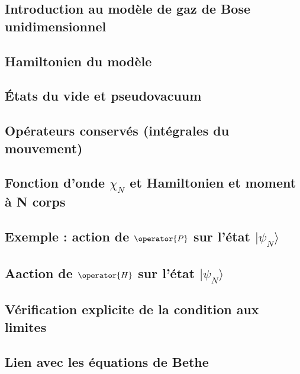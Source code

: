 \subsection{Introduction au modèle de gaz de Bose unidimensionnel}


\subsection{Hamiltonien du modèle}


\subsection{États du vide et pseudovacuum}



\subsection{Opérateurs conservés (intégrales du mouvement)}

 
\subsection{Fonction d’onde $\chi_N$ et Hamiltonien et moment à N corps}


\subsection{Exemple : action de $\operator{P}$ sur l’état $\vert \psi_N\rangle$}


\subsection{Aaction de $\operator{H}$ sur l’état $\vert \psi_N\rangle$}


\subsection{Vérification explicite de la condition aux limites}




\subsection{Lien avec les équations de Bethe}




